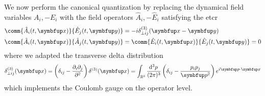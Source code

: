We now perform the canonical quantization by replacing the dynamical field variables $A_i,-E_i$ with the field operators $\hat{A}_i,-\hat{E}_i$ satisfying the \gls{etcr}~\cite[p.~197]{Greiner2013}
\begin{align}
	\comm{\hat{A}_i(t,\vb{x})}{\hat{E}_j(t,\vb{y})}
	&=
	-i
	\delta^{(3)}_{\perp ij}(\vb{x}-\vb{y})
	\label{eq:equal_time_commutation_relation_nonzero}
	\\
	\comm{\hat{A}_i(t,\vb{x})}{\hat{A}_j(t,\vb{y})}
	&=
	\comm{\hat{E}_i(t,\vb{x})}{\hat{E}_j(t,\vb{y})}
	=
	0
	\label{eq:equal_time_commutation_relation_zero}
\end{align}
where we adapted the transverse delta distribution~\cite[p.~198]{Greiner2013}
\begin{equation}
	\delta^{(3)}_{\perp ij}(\vb{x})
	=
	\left(
		\delta_{ij}
		-
		\frac{\partial_i\partial_j}{\partial^2}
	\right)
	\delta^{(3)}(\vb{x})
	=
	\int_{\mathbb{R}^3}\frac{\dd[3]{p}}{(2\pi)^3}
	\left(
		\delta_{ij}
		-
		\frac{p_ip_j}{\vb{p}^2}
	\right)
	e^{i\vb{p}\vdot\vb{x}}
	\label{eq:transverse_delta_distribution}
\end{equation}
which implements the Coulomb gauge on the operator level.

